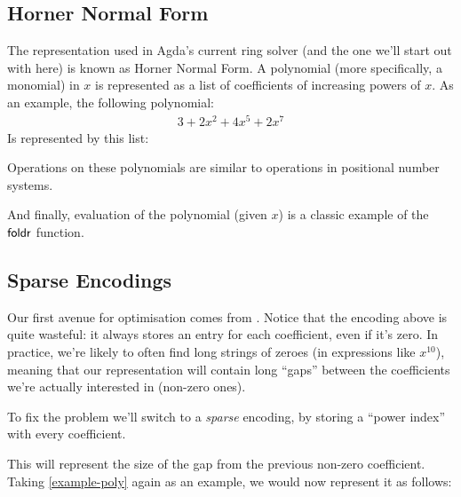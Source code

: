 \documentclass[acmsmall,review,anonymous]{acmart}\settopmatter{printfolios=true,printccs=false,printacmref=false}
\theoremstyle{remark}
\begin{document}
\subsection{Horner Normal Form}
The representation used in Agda's current ring solver (and the one we'll start
out with here) is known as Horner Normal Form. A polynomial (more specifically,
a monomial) in \(x\) is represented as a list of coefficients of increasing
powers of \(x\). As an example, the following polynomial:
\begin{align}
  3 + 2x^2 + 4x^5 + 2x^7 \label{example-poly}
\end{align}
Is represented by this list:
\begin{center}
\end{center}
Operations on these polynomials are similar to operations in positional number
systems.
\begin{multicols}{2}
\end{multicols}
And finally, evaluation of the polynomial (given \(x\)) is a classic example of
the \(\AgdaFunction{foldr}\) function.
\begin{center}
\end{center}
\subsection{Sparse Encodings}
Our first avenue for optimisation comes from \citet{gregoire_proving_2005}.
Notice that the encoding above is quite wasteful: it always stores an entry for
each coefficient, even if it's zero. In practice, we're likely to often find
long strings of zeroes (in expressions like \(x^{10}\)), meaning that our
representation will contain long ``gaps'' between the coefficients we're
actually interested in (non-zero ones).

To fix the problem we'll switch to a \emph{sparse} encoding, by storing a
``power index'' with every coefficient.
\begin{center}
\end{center}

This will represent the size of the gap from the previous non-zero coefficient.
Taking \ref{example-poly} again as an example, we would now represent it as
follows: 
\begin{center}
\end{center}
\end{document}
